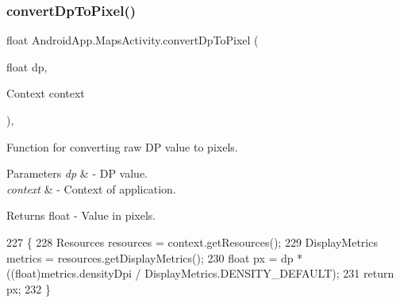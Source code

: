 \mbox{\label{class_android_app_1_1_maps_activity_a2f93b1f03094b96020cee7e06ce5fc85}} 
\subsubsection{\texorpdfstring{convert\+Dp\+To\+Pixel()}{convertDpToPixel()}}
{\footnotesize\ttfamily float Android\+App.\+Maps\+Activity.\+convert\+Dp\+To\+Pixel (\begin{DoxyParamCaption}\item[{float}]{dp,  }\item[{Context}]{context }\end{DoxyParamCaption})\hspace{0.3cm}{\ttfamily [inline]}, {\ttfamily [private]}}



Function for converting raw DP value to pixels. 


\begin{DoxyParams}{Parameters}
{\em dp} & -\/ DP value. \\
\hline
{\em context} & -\/ Context of application. \\
\hline
\end{DoxyParams}
\begin{DoxyReturn}{Returns}
float -\/ Value in pixels. 
\end{DoxyReturn}

\begin{DoxyCode}
227                                                              \{
228         Resources resources = context.getResources();
229         DisplayMetrics metrics = resources.getDisplayMetrics();
230         \textcolor{keywordtype}{float} px = dp * ((float)metrics.densityDpi / DisplayMetrics.DENSITY\_DEFAULT);
231         \textcolor{keywordflow}{return} px;
232     \}
\end{DoxyCode}
\mbox{\label{class_android_app_1_1_maps_activity_a77f66c756f18d56bd41f0ee1c889fb62}} 
